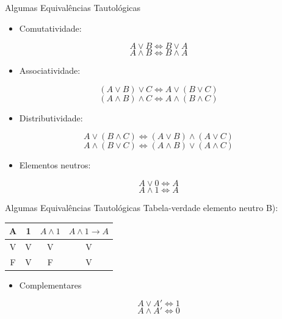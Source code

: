 \documentclass[aspectratio=169]{beamer}
\begin{document}
\begin{frame}{Algumas Equivalências Tautológicas}
    \begin{itemize}
        \item Comutatividade:
    \end{itemize}
    \[ A \vee B \iff B \vee A \]
    \[ A \wedge B \iff B \wedge A \]

    \begin{itemize}
        \item Associatividade:
    \end{itemize}
    \[(A \vee B) \vee C \iff A \vee (B \vee C) \]
    \[(A \wedge B) \wedge C \iff A \wedge (B \wedge C) \]

    \begin{itemize}
        \item Distributividade:
    \end{itemize}
    \[A \vee (B \wedge C) \iff (A \vee B) \wedge (A \vee C) \]
    \[A \wedge (B \vee C) \iff (A \wedge B) \vee (A \wedge C) \]

    \begin{itemize}
        \item Elementos neutros:
    \end{itemize}
    \[A \vee 0 \iff A \]
    \[A \wedge 1 \iff A \]

\end{frame}

\begin{frame}{Algumas Equivalências Tautológicas}
    Tabela-verdade elemento neutro B):

    \begin{table}[hb]
        \begin{tabular}{|c|c|c|c|}
            \hline
            \rowcolor{Asparagus}
            A & 1 & $ A \wedge 1 $ & $A \wedge 1 \rightarrow A $ \\
            \hline
            \hline
            \rowcolor{CambridgeBlue}
            V & V & V              & V                           \\
            \hline
            \rowcolor{TeaGreen}
            F & V & F              & V                           \\
            \hline
        \end{tabular}
    \end{table}

    \begin{itemize}
        \item Complementares
    \end{itemize}
    \[A \vee A' \iff 1 \]
    \[A \wedge A' \iff 0 \]

\end{frame}
\end{document}
